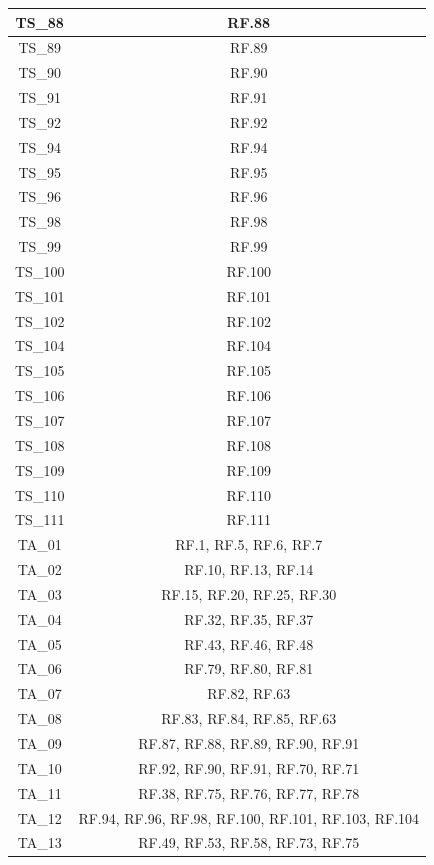 \documentclass[12pt, a4paper]{article}
\begin{document}
\begin{xltabular}{\textwidth}{|c|c|}
    TS\_88 & RF.88 \\\hline
    TS\_89 & RF.89 \\\hline
    TS\_90 & RF.90 \\\hline
    TS\_91 & RF.91 \\\hline
    TS\_92 & RF.92 \\\hline
    TS\_94 & RF.94 \\\hline
    TS\_95 & RF.95 \\\hline
    TS\_96 & RF.96 \\\hline
    TS\_98 & RF.98 \\\hline
    TS\_99 & RF.99 \\\hline
    TS\_100 & RF.100 \\\hline
    TS\_101 & RF.101 \\\hline
    TS\_102 & RF.102 \\\hline
    TS\_104 & RF.104 \\\hline
    TS\_105 & RF.105 \\\hline
    TS\_106 & RF.106 \\\hline
    TS\_107 & RF.107 \\\hline
    TS\_108 & RF.108 \\\hline
    TS\_109 & RF.109 \\\hline
    TS\_110 & RF.110 \\\hline
    TS\_111 & RF.111 \\\hline
    \hline
    TA\_01 & RF.1, RF.5, RF.6, RF.7 \\\hline
    TA\_02 & RF.10, RF.13, RF.14 \\\hline
    TA\_03 & RF.15, RF.20, RF.25, RF.30 \\\hline
    TA\_04 & RF.32, RF.35, RF.37 \\\hline
    TA\_05 & RF.43, RF.46, RF.48 \\\hline
    TA\_06 & RF.79, RF.80, RF.81 \\\hline
    TA\_07 & RF.82, RF.63 \\\hline
    TA\_08 & RF.83, RF.84, RF.85, RF.63 \\\hline
    TA\_09 & RF.87, RF.88, RF.89, RF.90, RF.91 \\\hline
    TA\_10 & RF.92, RF.90, RF.91, RF.70, RF.71 \\\hline
    TA\_11 & RF.38, RF.75, RF.76, RF.77, RF.78 \\\hline
    TA\_12 & RF.94, RF.96, RF.98, RF.100, RF.101, RF.103, RF.104 \\\hline
    TA\_13 & RF.49, RF.53, RF.58, RF.73, RF.75 \\\hline

\end{xltabular}
\end{document}
